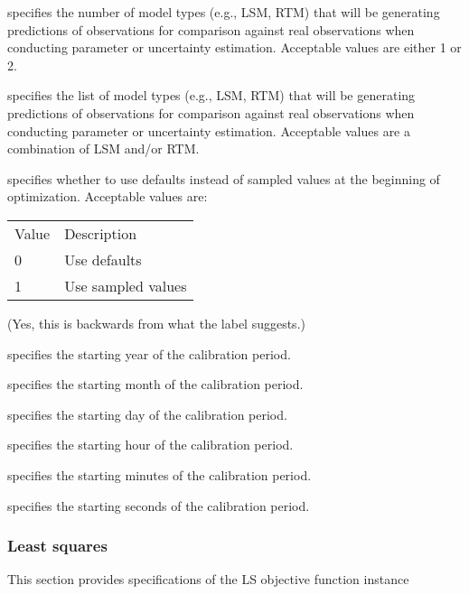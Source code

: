  specifies the number of model types (e.g., LSM, RTM) that will be
 generating predictions of observations for comparison against real
 observations when conducting parameter or uncertainty estimation.
 Acceptable values are either 1 or 2.

 specifies the list of model types (e.g., LSM, RTM) that will be
 generating predictions of observations for comparison against real
 observations when conducting parameter or uncertainty estimation.
 Acceptable values are a combination of LSM and/or RTM.

  specifies
 whether to use defaults instead of sampled values at the beginning
 of optimization.
 Acceptable values are:

 \begin{tabular}{ll}
 Value & Description        \\
 0     & Use defaults       \\
 1     & Use sampled values \\
 \end{tabular}
 \newline (Yes, this is backwards from what the label suggests.)

  specifies the starting year
 of the calibration period.

  specifies the starting
 month of the calibration period.

  specifies the starting day
 of the calibration period.

  specifies the starting hour
 of the calibration period.

  specifies the starting
 minutes of the calibration period.

  specifies the starting
 seconds of the calibration period.
 

 
 \subsubsection{Least squares} \label{ssec:ls}
 This section provides specifications of the LS objective function instance
 

